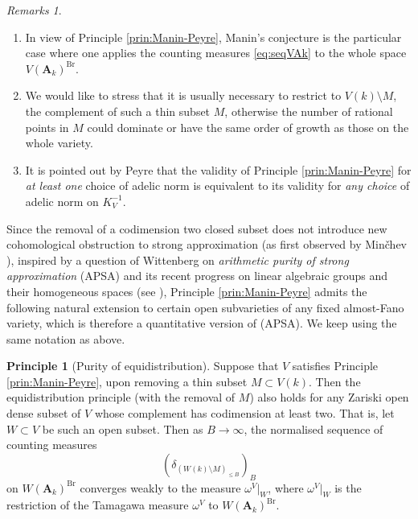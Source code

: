 \documentclass[11pt,letterpaper]{amsart}
\newcommand{\RA}{{\mathbf {A}}}
\theoremstyle{plain}
\numberwithin{equation}{section}
\theoremstyle{definition}
\newtheorem{principle}[theorem]{Principle}
\theoremstyle{remark}
\newtheorem{remarks}[theorem]{Remarks}
\begin{document}
\begin{remarks}
	\hfill
	\begin{enumerate}
		\item In view of Principle \ref{prin:Manin-Peyre}, Manin's conjecture is the particular case where one applies the counting measures \eqref{eq:seqVAk} to the whole space $V(\RA_k)^{\operatorname{Br}}$.
			\item We would like to stress that it is usually necessary to restrict to $V(k)\setminus M$, the complement of such a thin subset $M$, otherwise the number of rational points in $M$ could dominate or have the same order of growth as those on the whole variety.
		\item It is pointed out by Peyre \cite[\S3]{Peyre} that the validity of Principle \ref{prin:Manin-Peyre} for \emph{at least one} choice of adelic norm is equivalent to its validity for \emph{any choice} of adelic norm on $K_V^{-1}$.
	\end{enumerate}
\end{remarks}

Since the removal of a codimension two closed subset does not introduce new cohomological obstruction to strong approximation (as first observed by Min\v{c}hev \cite{Minchev}), inspired by a question of Wittenberg \cite[Question 2.11]{Wittenberg} on \emph{arithmetic purity of strong approximation} (APSA)  and its recent progress on linear algebraic groups and their homogeneous spaces (see \cite{Wei,Cao-Liang-Xu,Cao-Huang1}), Principle \ref{prin:Manin-Peyre} admits the following natural extension to certain open subvarieties of any fixed almost-Fano variety, which is therefore a quantitative version of (APSA). We keep using the same notation as above.
\begin{principle}[Purity of equidistribution]\label{prin:purity}
	Suppose that $V$ satisfies Principle \ref{prin:Manin-Peyre}, upon removing a thin subset $M\subset V(k)$. Then the equidistribution principle (with the removal of $M$) also holds for any Zariski open dense subset of $V$ whose complement has codimension at least two. 
	That is, let $W\subset V$ be such an open subset. Then as $B\to\infty$, the normalised sequence of counting measures
	\begin{equation}\label{eq:seqW}
		\left(\delta_{(W(k)\setminus M)_{\leqslant B}}\right)_B
	\end{equation} on $W(\RA_k)^{\operatorname{Br}}$ converges weakly to the measure $\omega^V|_W$, where $\omega^V|_W$ is the restriction of the  Tamagawa measure $\omega^V$ to $W(\RA_k)^{\operatorname{Br}}$. 
\end{principle}
\end{document}
